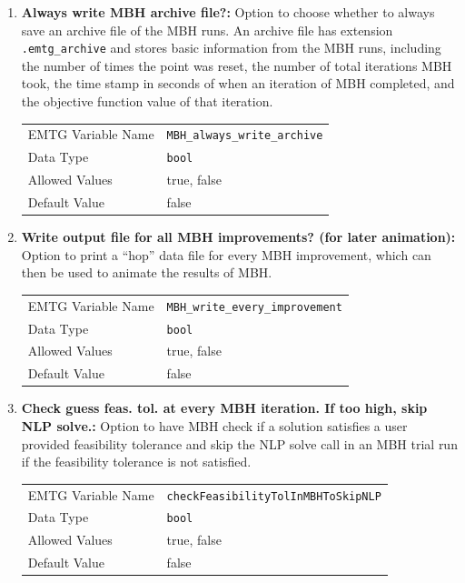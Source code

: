 \begin{enumerate}
    \item \textbf{Always write \ac{MBH} archive file?:} Option to choose whether to always save an archive file of the \ac{MBH} runs. An archive file has extension {\tt .emtg\_archive} and stores basic information from the \ac{MBH} runs, including the number of times the point was reset, the number of total iterations \ac{MBH} took, the time stamp in seconds of when an iteration of \ac{MBH} completed, and the objective function value of that iteration.
    \begin{table}[H]
        \hspace{2cm}
        \begin{tabular}{lp{5cm}}
        \ac{EMTG} Variable Name & \verb|MBH_always_write_archive| \\
        Data Type & \verb|bool| \\
        Allowed Values & true, false \\
        Default Value & false \\
        \end{tabular}
    \end{table}
    
    \item \textbf{Write output file for all \ac{MBH} improvements? (for later animation):} Option to print a ``hop'' data file for every \ac{MBH} improvement, which can then be used to animate the results of \ac{MBH}.
    \begin{table}[H]
        \hspace{2cm}
        \begin{tabular}{lp{5cm}}
        \ac{EMTG} Variable Name & \verb|MBH_write_every_improvement| \\
        Data Type & \verb|bool| \\
        Allowed Values & true, false \\
        Default Value & false \\
        \end{tabular}
    \end{table}
    
    \item \textbf{Check guess feas. tol. at every \ac{MBH} iteration. If too high, skip \ac{NLP} solve.:} Option to have \ac{MBH} check if a solution satisfies a user provided feasibility tolerance and skip the \ac{NLP} solve call in an \ac{MBH} trial run if the feasibility tolerance is not satisfied.
    \begin{table}[H]
        \hspace{2cm}
        \begin{tabular}{lp{5cm}}
        \ac{EMTG} Variable Name & \verb|checkFeasibilityTolInMBHToSkipNLP| \\
        Data Type & \verb|bool| \\
        Allowed Values & true, false \\
        Default Value & false \\
        \end{tabular}
    \end{table}
    

\end{enumerate}
